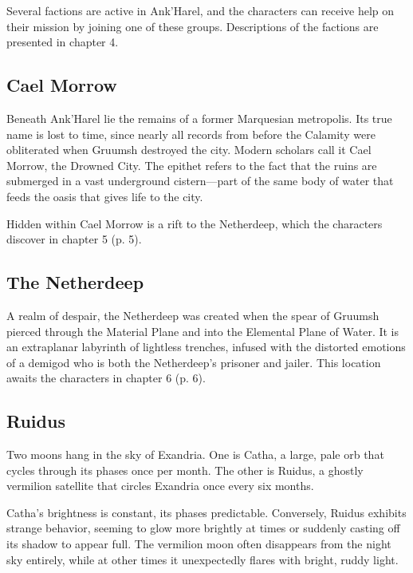 \documentclass[letterpaper, 11pt, bg=full, twocolumn]{dndbook}
\begin{document}
Several factions are active in Ank'Harel, and the characters can receive help on their mission by joining one of these groups. Descriptions of the factions are presented in chapter 4.

\subsection{Cael Morrow}

Beneath Ank'Harel lie the remains of a former Marquesian metropolis. Its true name is lost to time, since nearly all records from before the Calamity were obliterated when Gruumsh destroyed the city. Modern scholars call it Cael Morrow, the Drowned City. The epithet refers to the fact that the ruins are submerged in a vast underground cistern---part of the same body of water that feeds the oasis that gives life to the city.

Hidden within Cael Morrow is a rift to the Netherdeep, which the characters discover in chapter 5 (p. 5).

\subsection{The Netherdeep}

A realm of despair, the Netherdeep was created when the spear of Gruumsh pierced through the Material Plane and into the Elemental Plane of Water. It is an extraplanar labyrinth of lightless trenches, infused with the distorted emotions of a demigod who is both the Netherdeep's prisoner and jailer. This location awaits the characters in chapter 6 (p. 6).

\subsection{Ruidus}


Two moons hang in the sky of Exandria. One is Catha, a large, pale orb that cycles through its phases once per month. The other is Ruidus, a ghostly vermilion satellite that circles Exandria once every six months.

Catha's brightness is constant, its phases predictable. Conversely, Ruidus exhibits strange behavior, seeming to glow more brightly at times or suddenly casting off its shadow to appear full. The vermilion moon often disappears from the night sky entirely, while at other times it unexpectedly flares with bright, ruddy light.
\end{document}
